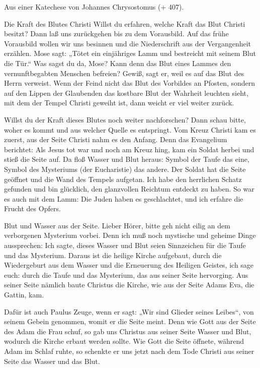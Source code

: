 \vspace{5pt}

Aus einer Katechese von Johannes Chrysostomus (+ 407).


\vspace{5pt}



\lettrine[lines=3]{D}{}ie Kraft des Blutes Christi Willst du erfahren, welche Kraft das Blut Christi besitzt? Dann laß uns zurückgehen bis zu dem Vorausbild. Auf das frühe Vorausbild wollen wir uns besinnen und die Niederschrift aus der Vergangenheit erzählen. Mose sagt: „Tötet ein einjähriges Lamm und bestreicht mit seinem Blut die Tür.“ Was sagst du da, Mose? Kann denn das Blut eines Lammes den vernunftbegabten Menschen befreien? Gewiß, sagt er, weil es auf das Blut des Herrn verweist. Wenn der Feind nicht das Blut des Vorbildes an Pfosten, sondern auf den Lippen der Glaubenden das kostbare Blut der Wahrheit leuchten sieht, mit dem der Tempel Christi geweiht ist, dann weicht er viel weiter zurück. 

Willst du der Kraft dieses Blutes noch weiter nachforschen? Dann schau bitte, woher es kommt und aus welcher Quelle es entspringt. Vom Kreuz Christi kam es zuerst, aus der Seite Christi nahm es den Anfang. Denn das Evangelium berichtet: Als Jesus tot war und noch am Kreuz hing, kam ein Soldat herbei und stieß die Seite auf. Da floß Wasser und Blut heraus: Symbol der Taufe das eine, Symbol des Mysteriums (der Eucharistie) das andere. Der Soldat hat die Seite geöffnet und die Wand des Tempels aufgetan. Ich habe den herrlichen Schatz gefunden und bin glücklich, den glanzvollen Reichtum entdeckt zu haben. So war es auch mit dem Lamm: Die Juden haben es geschlachtet, und ich erfahre die Frucht des Opfers. 

Blut und Wasser aus der Seite. Lieber Hörer, bitte geh nicht eilig an dem verborgenen Mysterium vorbei. Denn ich muß noch mystische und geheime Dinge aussprechen: Ich sagte, dieses Wasser und Blut seien Sinnzeichen für die Taufe und das Mysterium. Daraus ist die heilige Kirche aufgebaut, durch die Wiedergeburt aus dem Wasser und die Erneuerung des Heiligen Geistes, ich sage euch: durch die Taufe und das Mysterium, das aus seiner Seite hervorging. Aus seiner Seite nämlich baute Christus die Kirche, wie aus der Seite Adams Eva, die Gattin, kam. 

Dafür ist auch Paulus Zeuge, wenn er sagt: „Wir sind Glieder seines Leibes“, von seinem Gebein genommen, womit er die Seite meint. Denn wie Gott aus der Seite des Adam die Frau schuf, so gab uns Christus aus seiner Seite Wasser und Blut, wodurch die Kirche erbaut werden sollte. Wie Gott die Seite öffnete, während Adam im Schlaf ruhte, so schenkte er uns jetzt nach dem Tode Christi aus seiner Seite das Wasser und das Blut.
